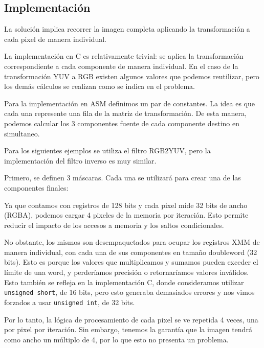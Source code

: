 \subsection{Implementación}

La solución implica recorrer la imagen completa aplicando la transformación a cada pixel de manera individual.

La implementación en C es relativamente trivial: se aplica la transformación correspondiente a cada componente de manera individual. En el caso de la transformación YUV a RGB existen algunos valores que podemos reutilizar, pero los demás cálculos se realizan como se indica en el problema.

Para la implementación en ASM definimos un par de constantes. La idea es que cada una represente una fila de la matriz de transformación. De esta manera, podemos calcular los 3 componentes fuente de cada componente destino en simultaneo.

Para los siguientes ejemplos se utiliza el filtro RGB2YUV, pero la implementación del filtro inverso es muy similar.

Primero, se definen 3 máscaras. Cada una se utilizará para crear una de las componentes finales:

\begin{center}
	 

	 

	 
\end{center}

Ya que contamos con registros de 128 bits y cada pixel mide 32 bits de ancho (RGBA), podemos cargar 4 pixeles de la memoria por iteración. Esto permite reducir el impacto de los accesos a memoria y los saltos condicionales.

No obstante, los mismos son desempaquetados para ocupar los registros XMM de manera individual, con cada una de sus componentes en tamaño doubleword (32 bits). Esto es porque los valores que multiplicamos y sumamos pueden exceder el límite de una word, y perderíamos precisión o retornaríamos valores inválidos. Esto también se refleja en la implementación C, donde consideramos utilizar \texttt{unsigned short}, de 16 bits, pero esto generaba demasiados errores y nos vimos forzados a usar \texttt{unsigned int}, de 32 bits.

Por lo tanto, la lógica de procesamiento de cada pixel se ve repetida 4 veces, una por pixel por iteración. Sin embargo, tenemos la garantía que la imagen tendrá como ancho un múltiplo de 4, por lo que esto no presenta un problema.


